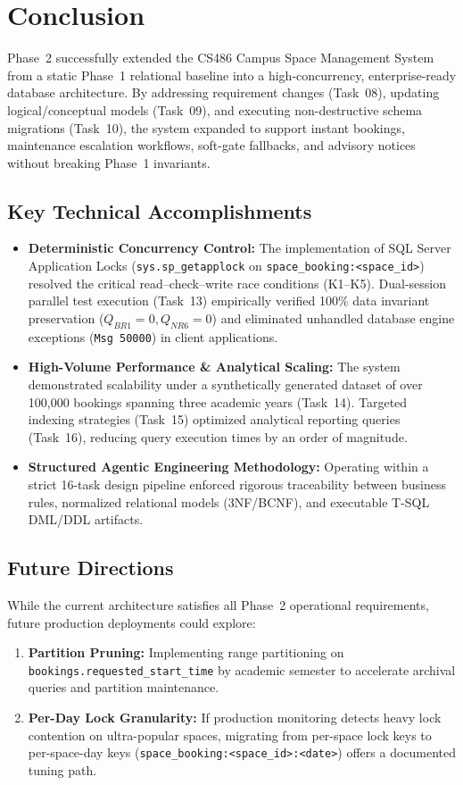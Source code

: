 \section{Conclusion}
\label{sec:conclusion}

Phase~2 successfully extended the CS486 Campus Space Management System from a static Phase~1 relational baseline into a high-concurrency, enterprise-ready database architecture. By addressing requirement changes (Task~08), updating logical/conceptual models (Task~09), and executing non-destructive schema migrations (Task~10), the system expanded to support instant bookings, maintenance escalation workflows, soft-gate fallbacks, and advisory notices without breaking Phase~1 invariants.

\subsection{Key Technical Accomplishments}

\begin{itemize}
    \item \textbf{Deterministic Concurrency Control:} The implementation of SQL Server Application Locks (\texttt{sys.sp\_getapplock} on \texttt{space\_booking:<space\_id>}) resolved the critical read--check--write race conditions (K1--K5). Dual-session parallel test execution (Task~13) empirically verified 100\% data invariant preservation ($Q_{BR1} = 0, Q_{NR6} = 0$) and eliminated unhandled database engine exceptions (\texttt{Msg 50000}) in client applications.
    \item \textbf{High-Volume Performance \& Analytical Scaling:} The system demonstrated scalability under a synthetically generated dataset of over 100{,}000 bookings spanning three academic years (Task~14). Targeted indexing strategies (Task~15) optimized analytical reporting queries (Task~16), reducing query execution times by an order of magnitude.
    \item \textbf{Structured Agentic Engineering Methodology:} Operating within a strict 16-task design pipeline enforced rigorous traceability between business rules, normalized relational models (3NF/BCNF), and executable T-SQL DML/DDL artifacts.
\end{itemize}

\subsection{Future Directions}

While the current architecture satisfies all Phase~2 operational requirements, future production deployments could explore:
\begin{enumerate}
    \item \textbf{Partition Pruning:} Implementing range partitioning on \texttt{bookings.requested\_start\_time} by academic semester to accelerate archival queries and partition maintenance.
    \item \textbf{Per-Day Lock Granularity:} If production monitoring detects heavy lock contention on ultra-popular spaces, migrating from per-space lock keys to per-space-day keys (\texttt{space\_booking:<space\_id>:<date>}) offers a documented tuning path.
\end{enumerate}